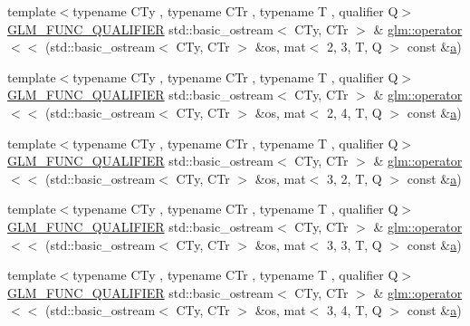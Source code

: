 \begin{DoxyCompactItemize}
\item 
{\footnotesize template$<$typename C\+Ty , typename C\+Tr , typename T , qualifier Q$>$ }\\\mbox{\hyperlink{setup_8hpp_a33fdea6f91c5f834105f7415e2a64407}{G\+L\+M\+\_\+\+F\+U\+N\+C\+\_\+\+Q\+U\+A\+L\+I\+F\+I\+ER}} std\+::basic\+\_\+ostream$<$ C\+Ty, C\+Tr $>$ \& \mbox{\hyperlink{group__gtx__io_ga2bf4942715dc303be4a8752a44adce55}{glm\+::operator$<$$<$}} (std\+::basic\+\_\+ostream$<$ C\+Ty, C\+Tr $>$ \&os, mat$<$ 2, 3, T, Q $>$ const \&\mbox{\hyperlink{_s_d_l__opengl__glext_8h_a3309789fc188587d666cda5ece79cf82}{a}})
\item 
{\footnotesize template$<$typename C\+Ty , typename C\+Tr , typename T , qualifier Q$>$ }\\\mbox{\hyperlink{setup_8hpp_a33fdea6f91c5f834105f7415e2a64407}{G\+L\+M\+\_\+\+F\+U\+N\+C\+\_\+\+Q\+U\+A\+L\+I\+F\+I\+ER}} std\+::basic\+\_\+ostream$<$ C\+Ty, C\+Tr $>$ \& \mbox{\hyperlink{group__gtx__io_ga79ad9284d3311aad760f84621197c972}{glm\+::operator$<$$<$}} (std\+::basic\+\_\+ostream$<$ C\+Ty, C\+Tr $>$ \&os, mat$<$ 2, 4, T, Q $>$ const \&\mbox{\hyperlink{_s_d_l__opengl__glext_8h_a3309789fc188587d666cda5ece79cf82}{a}})
\item 
{\footnotesize template$<$typename C\+Ty , typename C\+Tr , typename T , qualifier Q$>$ }\\\mbox{\hyperlink{setup_8hpp_a33fdea6f91c5f834105f7415e2a64407}{G\+L\+M\+\_\+\+F\+U\+N\+C\+\_\+\+Q\+U\+A\+L\+I\+F\+I\+ER}} std\+::basic\+\_\+ostream$<$ C\+Ty, C\+Tr $>$ \& \mbox{\hyperlink{group__gtx__io_gacd6666708d198e61ac99b5b144aafdf1}{glm\+::operator$<$$<$}} (std\+::basic\+\_\+ostream$<$ C\+Ty, C\+Tr $>$ \&os, mat$<$ 3, 2, T, Q $>$ const \&\mbox{\hyperlink{_s_d_l__opengl__glext_8h_a3309789fc188587d666cda5ece79cf82}{a}})
\item 
{\footnotesize template$<$typename C\+Ty , typename C\+Tr , typename T , qualifier Q$>$ }\\\mbox{\hyperlink{setup_8hpp_a33fdea6f91c5f834105f7415e2a64407}{G\+L\+M\+\_\+\+F\+U\+N\+C\+\_\+\+Q\+U\+A\+L\+I\+F\+I\+ER}} std\+::basic\+\_\+ostream$<$ C\+Ty, C\+Tr $>$ \& \mbox{\hyperlink{group__gtx__io_ga4de3d5bb444fa0ef69608fc068e27d0e}{glm\+::operator$<$$<$}} (std\+::basic\+\_\+ostream$<$ C\+Ty, C\+Tr $>$ \&os, mat$<$ 3, 3, T, Q $>$ const \&\mbox{\hyperlink{_s_d_l__opengl__glext_8h_a3309789fc188587d666cda5ece79cf82}{a}})
\item 
{\footnotesize template$<$typename C\+Ty , typename C\+Tr , typename T , qualifier Q$>$ }\\\mbox{\hyperlink{setup_8hpp_a33fdea6f91c5f834105f7415e2a64407}{G\+L\+M\+\_\+\+F\+U\+N\+C\+\_\+\+Q\+U\+A\+L\+I\+F\+I\+ER}} std\+::basic\+\_\+ostream$<$ C\+Ty, C\+Tr $>$ \& \mbox{\hyperlink{group__gtx__io_gaa6f5541be2f182df05341e1d254c9a93}{glm\+::operator$<$$<$}} (std\+::basic\+\_\+ostream$<$ C\+Ty, C\+Tr $>$ \&os, mat$<$ 3, 4, T, Q $>$ const \&\mbox{\hyperlink{_s_d_l__opengl__glext_8h_a3309789fc188587d666cda5ece79cf82}{a}})

\end{DoxyCompactItemize}
